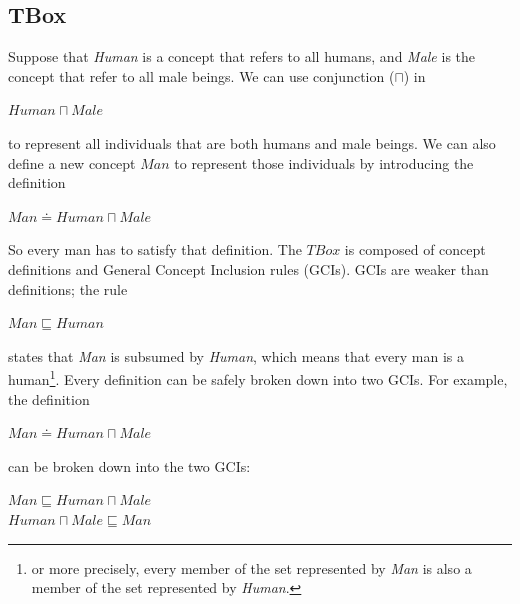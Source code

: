 \subsection{TBox}
Suppose that \textit{Human} is a concept that refers to all humans, and \textit{Male} is the concept that refer to all male beings. We can use conjunction ($\sqcap$) in
\begin{center}
$Human \sqcap Male$
\end{center}
to represent all individuals that are both humans and male beings. We can also define a new concept $Man$ to represent those individuals by introducing the definition
\begin{center}
$Man \doteq Human \sqcap Male$
\end{center}
So every man has to satisfy that definition. The $TBox$ is composed of concept definitions and General Concept Inclusion rules (GCIs). GCIs are weaker than definitions; the rule
\begin{center}
$Man \sqsubseteq Human$
\end{center}
states that \textit{Man} is subsumed by \textit{Human}, which means that every man is a human\footnote{or more precisely, every member of the set represented by \textit{Man} is also a member of the set represented by \textit{Human}.}. Every definition can be safely broken down into two GCIs. For example, the definition
\begin{center}
$Man \doteq Human \sqcap Male$
\end{center}
can be broken down into the two GCIs:
\begin{center}
$Man \sqsubseteq Human \sqcap Male$ \\
$Human \sqcap Male \sqsubseteq Man$
\end{center}

